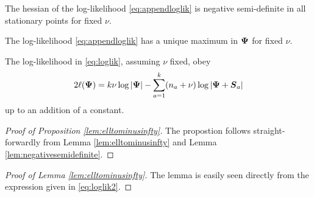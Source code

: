 \documentclass{article}\usepackage[]{graphicx}\usepackage[]{color}
\begin{document}
\begin{lemma}
\label{lem:negativesemidefinite}
The hessian of the log-likelihood \eqref{eq:appendloglik} is negative semi-definite in all stationary points for fixed $\nu$.
\end{lemma}

\begin{proposition}
The log-likelihood \eqref{eq:appendloglik} has a unique maximum in ${\boldsymbol{\Psi}}$ for fixed $\nu$.
\end{proposition}

\noindent The log-likelihood in \eqref{eq:loglik}, assuming $\nu$ fixed, obey
\begin{align}
  2\ell({\boldsymbol{\Psi}})
  = k\nu\log|{\boldsymbol{\Psi}}| - \sum_{a=1}^k (n_a + \nu)\log|{\boldsymbol{\Psi}} + {\boldsymbol{S}}_a|
\label{eq:loglik2}
\end{align}
up to an addition of a constant.

\begin{proof}[Proof of Proposition \ref{lem:elltominusinfty}]
The propostion follows straight-forwardly from Lemma \ref{lem:elltominusinfty} and
Lemma \ref{lem:negativesemidefinite}.
\end{proof}

\begin{proof}[Proof of Lemma \ref{lem:elltominusinfty}]
The lemma is easily seen directly from the expression given in \eqref{eq:loglik2}.
\end{proof}
\end{document}
